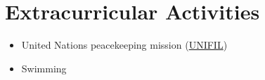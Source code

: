 \section{Extracurricular Activities}\label{extracurricular-activities}

\begin{itemize}
\tightlist
\item
  United Nations peacekeeping mission
  (\href{https://en.wikipedia.org/wiki/United_Nations_Interim_Force_in_Lebanon}{UNIFIL})
\item
  Swimming
\end{itemize}
